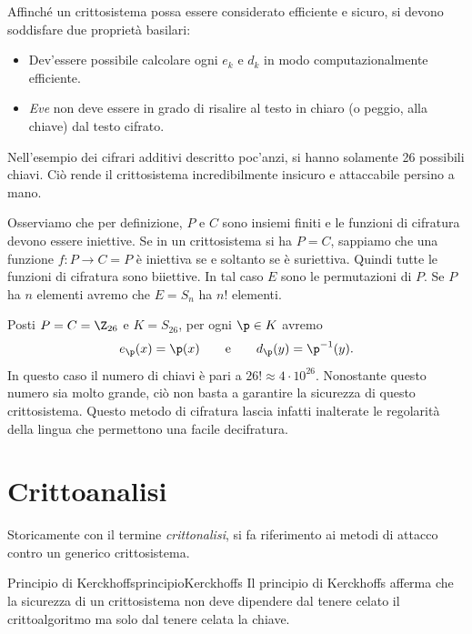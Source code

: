 	Affinché un crittosistema possa essere considerato efficiente e sicuro, si devono soddisfare due proprietà basilari:
	\begin{itemize}
		\item Dev'essere possibile calcolare ogni \(e_k\) e \(d_k\) in modo computazionalmente efficiente.
		\item \emph{Eve} non deve essere in grado di risalire al testo in chiaro (o peggio, alla chiave) dal testo cifrato.
	\end{itemize}
	Nell'esempio dei cifrari additivi descritto poc'anzi, si hanno solamente 26 possibili chiavi.
	Ciò rende il crittosistema incredibilmente insicuro e attaccabile persino a mano.

	Osserviamo che per definizione, \(P\) e \(C\) sono insiemi finiti e le funzioni di cifratura devono essere iniettive.
	Se in un crittosistema si ha \(P=C\), sappiamo che una funzione \(f\colon P \to C = P\) è iniettiva se e soltanto se è suriettiva.
	Quindi tutte le funzioni di cifratura sono biiettive. In tal caso \(E\) sono le permutazioni di \(P\).
	Se \(P\) ha \(n\) elementi avremo che \(E=S_n\) ha \(n!\) elementi.

	\begin{ese}
	Posti \(P=C=\Z_{26}\) e \(K=S_{26}\), per ogni \(\p\in K\) avremo
		\[
		e_\p(x) = \p(x) \qquad\text{e}\qquad d_\p(y) = \p^{-1}(y).
		\]
	In questo caso il numero di chiavi è pari a \(26! \approx 4\cdot 10^{26}\).
	Nonostante questo numero sia molto grande, ciò non basta a garantire la sicurezza di questo crittosistema.
	Questo metodo di cifratura lascia infatti inalterate le regolarità della lingua che permettono una facile decifratura.
	\end{ese}

\section{Crittoanalisi}

	Storicamente con il termine \emph{crittonalisi}, si fa riferimento ai metodi di attacco contro un generico crittosistema.

	\begin{defn}{Principio di Kerckhoffs}{principioKerckhoffs}
	Il principio di Kerckhoffs afferma che la sicurezza di un crittosistema non deve dipendere dal tenere celato il crittoalgoritmo ma solo dal tenere celata la chiave.
	\end{defn}

